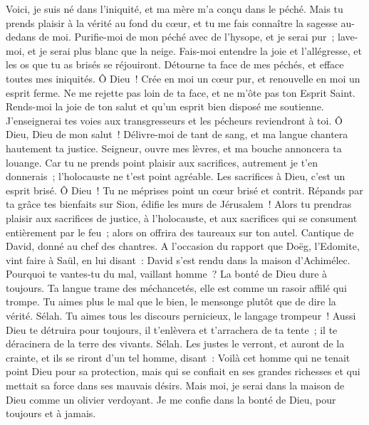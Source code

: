 \begin{multicols}{2}
Voici, je suis né dans l'iniquité, et ma mère m'a conçu dans le péché.
Mais tu prends plaisir à la vérité au fond du cœur, et tu me fais connaître la sagesse au-dedans de moi.
Purifie-moi de mon péché avec de l'hysope, et je serai pur~; lave-moi, et je serai plus blanc que la neige.
Fais-moi entendre la joie et l'allégresse, et les os que tu as brisés se réjouiront.
Détourne ta face de mes péchés, et efface toutes mes iniquités.
Ô Dieu~! Crée en moi un cœur pur, et renouvelle en moi un esprit ferme.
Ne me rejette pas loin de ta face, et ne m'ôte pas ton Esprit Saint.
Rends-moi la joie de ton salut et qu'un esprit bien disposé me soutienne.
J'enseignerai tes voies aux transgresseurs et les pécheurs reviendront à toi.
Ô Dieu, Dieu de mon salut~! Délivre-moi de tant de sang, et ma langue chantera hautement ta justice.
Seigneur, ouvre mes lèvres, et ma bouche annoncera ta louange.
Car tu ne prends point plaisir aux sacrifices, autrement je t'en donnerais~; l'holocauste ne t'est point agréable.
Les sacrifices à Dieu, c'est un esprit brisé. Ô Dieu~! Tu ne méprises point un cœur brisé et contrit.
Répands par ta grâce tes bienfaits sur Sion, édifie les murs de Jérusalem~!
Alors tu prendras plaisir aux sacrifices de justice, à l'holocauste, et aux sacrifices qui se consument entièrement par le feu~; alors on offrira des taureaux sur ton autel.
\VerseOne{}Cantique de David, donné au chef des chantres.
A l'occasion du rapport que Doëg, l'Edomite, vint faire à Saül, en lui disant~: David s'est rendu dans la maison d'Achimélec.
Pourquoi te vantes-tu du mal, vaillant homme~? La bonté de Dieu dure à toujours.
Ta langue trame des méchancetés, elle est comme un rasoir affilé qui trompe.
Tu aimes plus le mal que le bien, le mensonge plutôt que de dire la vérité. Sélah.
Tu aimes tous les discours pernicieux, le langage trompeur~!
Aussi Dieu te détruira pour toujours, il t'enlèvera et t'arrachera de ta tente~; il te déracinera de la terre des vivants. Sélah.
Les justes le verront, et auront de la crainte, et ils se riront d'un tel homme, disant~:
Voilà cet homme qui ne tenait point Dieu pour sa protection, mais qui se confiait en ses grandes richesses et qui mettait sa force dans ses mauvais désirs.
Mais moi, je serai dans la maison de Dieu comme un olivier verdoyant. Je me confie dans la bonté de Dieu, pour toujours et à jamais.

\end{multicols}
